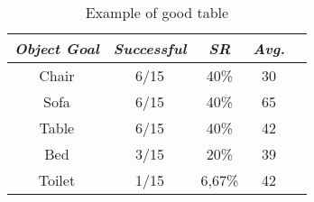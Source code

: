 \begin{table}[t]
    \begin{revisebox}{2.1}
    \centering
    \caption{Example of good table}
    \label{tab:vlv}
    \begin{tabular}{c|cccc}
        \toprule
        \textit{\textbf{Object Goal}} & \textit{\textbf{Successful}} & \textit{\textbf{SR}} & \textit{\textbf{Avg.}} \\ \midrule
        Chair                         & 6/15                                  & 40\%                 & 30                                       \\
        Sofa                          & 6/15                                  & 40\%                 & 65                                       \\
        Table                         & 6/15                                  & 40\%                 & 42                                       \\
        Bed                           & 3/15                                  & 20\%                 & 39                                       \\
        Toilet                        & 1/15                                  & 6,67\%               & 42                                       \\ \bottomrule
    \end{tabular}
    \end{revisebox}
\end{table}